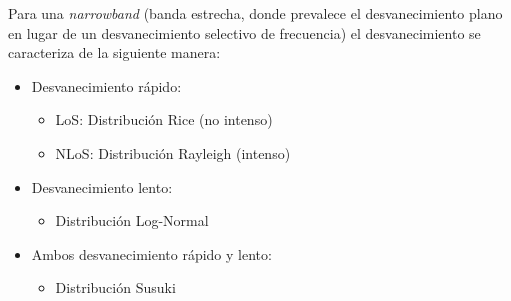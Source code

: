 Para una \textit{narrowband} (banda estrecha, donde prevalece el desvanecimiento plano en lugar de un desvanecimiento selectivo de frecuencia) el desvanecimiento se caracteriza de la siguiente manera:
\begin{itemize}
    \item Desvanecimiento rápido:
    \begin{itemize}
        \item LoS: Distribución Rice (no intenso)
        \item NLoS: Distribución Rayleigh (intenso)
    \end{itemize}
    \item Desvanecimiento lento:
    \begin{itemize}
        \item Distribución Log-Normal
    \end{itemize}
    \item Ambos desvanecimiento rápido y lento:
    \begin{itemize}
        \item Distribución Susuki
    \end{itemize}
\end{itemize}

